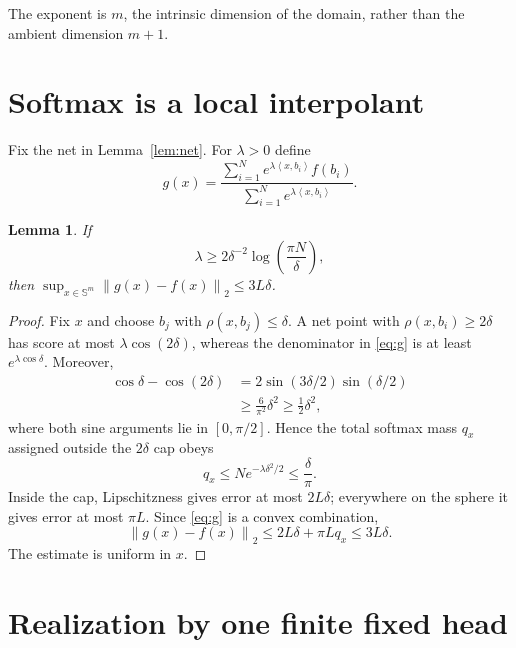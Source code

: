 \documentclass[11pt]{article}
\newtheorem{lemma}[theorem]{Lemma}
\newcommand{\Sph}{\mathbb S}
\newcommand{\norm}[1]{\left\lVert #1\right\rVert}
\newcommand{\ip}[2]{\left\langle #1,#2\right\rangle}
\begin{document}
The exponent is $m$, the intrinsic dimension of the domain, rather than the
ambient dimension $m+1$.

\section{Softmax is a local interpolant}

Fix the net in Lemma~\ref{lem:net}.  For $\lambda>0$ define
\begin{equation}\label{eq:g}
 g(x)=\frac{\sum_{i=1}^N e^{\lambda\ip{x}{b_i}}f(b_i)}
 {\sum_{i=1}^N e^{\lambda\ip{x}{b_i}}}.
\end{equation}

\begin{lemma}\label{lem:local}
If
\begin{equation}\label{eq:lambda-local}
 \lambda\ge 2\delta^{-2}\log\left(\frac{\pi N}{\delta}\right),
\end{equation}
then $\sup_{x\in\Sph^m}\norm{g(x)-f(x)}_2\le3L\delta$.
\end{lemma}

\begin{proof}
Fix $x$ and choose $b_j$ with $\rho(x,b_j)\le\delta$.  A net point with
$\rho(x,b_i)\ge2\delta$ has score at most $\lambda\cos(2\delta)$, whereas the
denominator in \eqref{eq:g} is at least $e^{\lambda\cos\delta}$.  Moreover,
\begin{align*}
 \cos\delta-\cos(2\delta)
 &=2\sin(3\delta/2)\sin(\delta/2)\\
 &\ge \frac{6}{\pi^2}\delta^2\ge\frac12\delta^2,
\end{align*}
where both sine arguments lie in $[0,\pi/2]$.  Hence the total softmax mass
$q_x$ assigned outside the $2\delta$ cap obeys
\[
 q_x\le N e^{-\lambda\delta^2/2}\le\frac{\delta}{\pi}.
\]
Inside the cap, Lipschitzness gives error at most $2L\delta$; everywhere on
the sphere it gives error at most $\pi L$.  Since \eqref{eq:g} is a convex
combination,
\[
 \norm{g(x)-f(x)}_2
 \le2L\delta+\pi Lq_x\le3L\delta.
\]
The estimate is uniform in $x$.
\end{proof}

\section{Realization by one finite fixed head}
\end{document}
